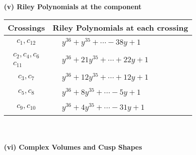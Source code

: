 \documentclass[1p]{elsarticle_modified}
\theoremstyle{definition}
\begin{document}
\newpage\renewcommand{\arraystretch}{1}
\flushleft \textbf{(v) Riley Polynomials at the component}\newline \\
\begin{tabular}{m{50pt}|m{274pt}}
Crossings & \hspace{64pt}Riley Polynomials at each crossing \\
\hline $$\begin{aligned}c_{1},c_{12}\end{aligned}$$&$\begin{aligned}
&y^{36}+y^{35}+\cdots-38 y+1
\end{aligned}$\\
\hline $$\begin{aligned}c_{2},c_{4},c_{6}\\c_{11}\end{aligned}$$&$\begin{aligned}
&y^{36}+21 y^{35}+\cdots+22 y+1
\end{aligned}$\\
\hline $$\begin{aligned}c_{3},c_{7}\end{aligned}$$&$\begin{aligned}
&y^{36}+12 y^{35}+\cdots+12 y+1
\end{aligned}$\\
\hline $$\begin{aligned}c_{5},c_{8}\end{aligned}$$&$\begin{aligned}
&y^{36}+8 y^{35}+\cdots-5 y+1
\end{aligned}$\\
\hline $$\begin{aligned}c_{9},c_{10}\end{aligned}$$&$\begin{aligned}
&y^{36}+4 y^{35}+\cdots-31 y+1
\end{aligned}$\\
\hline
\end{tabular}\\~\\
\newpage\flushleft \textbf{(vi) Complex Volumes and Cusp Shapes}
\end{document}
